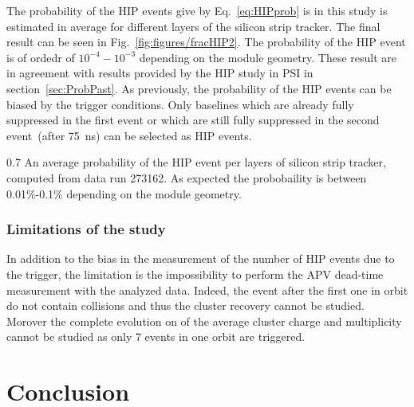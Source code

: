 The probability of the HIP events give by Eq.~\ref{eq:HIPprob} is in this study is estimated in average for different layers of the silicon strip tracker. The final result can be seen in Fig.~\ref{fig:figures/fracHIP2}. The probability of the HIP event is of ordedr of $10^{-4}-10^{-3}$ depending on the module geometry. These result are in agreement with results provided by the HIP study in PSI in section~\ref{sec:ProbPast}. As previously, the probability of the HIP events can be biased by the trigger conditions. Only baselines which are already fully suppressed in the first event or which are still fully suppressed in the second event~(after 75~ns) can be selected as HIP events.



                 {0.7}       %
                 {An average probability of the HIP event per layers of silicon strip tracker, computed from data run 273162. As expected the probobaility is between 0.01\%-0.1\% depending on the module geometry.  } %

\subsubsection{Limitations of the study}
 
In addition to the bias in the measurement of the number of HIP events due to the trigger, the limitation is the impossibility to perform the APV dead-time measurement with the analyzed data. Indeed, the event after the first one in orbit do not contain collisions and thus the cluster recovery cannot be studied. Morover the complete evolution on of the average cluster charge and multiplicity cannot be studied as only 7 events in one orbit are triggered. 

\section{Conclusion}

